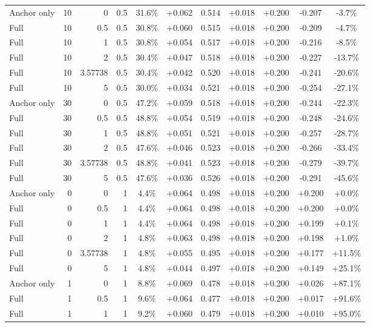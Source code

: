 \begin{table}[htbp]
\begin{tabular}{lrrrccccccc}
Anchor only & 10 & 0 & 0.5 & 31.6\% & +0.062 & 0.514 & +0.018 & +0.200 & -0.207 & -3.7\% \\
Full & 10 & 0.5 & 0.5 & 30.8\% & +0.060 & 0.515 & +0.018 & +0.200 & -0.209 & -4.7\% \\
Full & 10 & 1 & 0.5 & 30.8\% & +0.054 & 0.517 & +0.018 & +0.200 & -0.216 & -8.5\% \\
Full & 10 & 2 & 0.5 & 30.4\% & +0.047 & 0.518 & +0.018 & +0.200 & -0.227 & -13.7\% \\
Full & 10 & 3.57738 & 0.5 & 30.4\% & +0.042 & 0.520 & +0.018 & +0.200 & -0.241 & -20.6\% \\
Full & 10 & 5 & 0.5 & 30.0\% & +0.034 & 0.521 & +0.018 & +0.200 & -0.254 & -27.1\% \\
Anchor only & 30 & 0 & 0.5 & 47.2\% & +0.059 & 0.518 & +0.018 & +0.200 & -0.244 & -22.3\% \\
Full & 30 & 0.5 & 0.5 & 48.8\% & +0.054 & 0.519 & +0.018 & +0.200 & -0.248 & -24.6\% \\
Full & 30 & 1 & 0.5 & 48.8\% & +0.051 & 0.521 & +0.018 & +0.200 & -0.257 & -28.7\% \\
Full & 30 & 2 & 0.5 & 47.6\% & +0.046 & 0.523 & +0.018 & +0.200 & -0.266 & -33.4\% \\
Full & 30 & 3.57738 & 0.5 & 48.8\% & +0.041 & 0.523 & +0.018 & +0.200 & -0.279 & -39.7\% \\
Full & 30 & 5 & 0.5 & 47.6\% & +0.036 & 0.526 & +0.018 & +0.200 & -0.291 & -45.6\% \\
Anchor only & 0 & 0 & 1 & 4.4\% & +0.064 & 0.498 & +0.018 & +0.200 & +0.200 & +0.0\% \\
Full & 0 & 0.5 & 1 & 4.4\% & +0.064 & 0.498 & +0.018 & +0.200 & +0.200 & +0.0\% \\
Full & 0 & 1 & 1 & 4.4\% & +0.064 & 0.498 & +0.018 & +0.200 & +0.199 & +0.1\% \\
Full & 0 & 2 & 1 & 4.8\% & +0.063 & 0.498 & +0.018 & +0.200 & +0.198 & +1.0\% \\
Full & 0 & 3.57738 & 1 & 4.8\% & +0.055 & 0.495 & +0.018 & +0.200 & +0.177 & +11.5\% \\
Full & 0 & 5 & 1 & 4.8\% & +0.044 & 0.497 & +0.018 & +0.200 & +0.149 & +25.1\% \\
Anchor only & 1 & 0 & 1 & 8.8\% & +0.069 & 0.478 & +0.018 & +0.200 & +0.026 & +87.1\% \\
Full & 1 & 0.5 & 1 & 9.6\% & +0.064 & 0.477 & +0.018 & +0.200 & +0.017 & +91.6\% \\
Full & 1 & 1 & 1 & 9.2\% & +0.060 & 0.479 & +0.018 & +0.200 & +0.010 & +95.0\% \\

\end{tabular}
\end{table}
